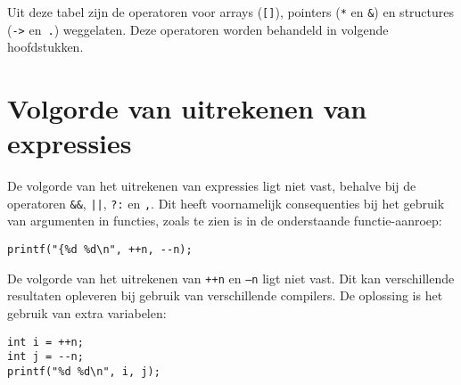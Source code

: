 Uit deze tabel zijn de operatoren voor arrays (\texttt{[]}), pointers (\texttt{*} en \texttt{\&}) en structures (\texttt{->} en~\texttt{.}) weggelaten. Deze operatoren worden behandeld in volgende hoofdstukken.


\section{Volgorde van uit\textsl{}rekenen van expressies}
De volgorde van het uitrekenen van expressies ligt niet vast, behalve bij de operatoren \texttt{\&\&}, \texttt{||}, \texttt{?:} en \texttt{,}. Dit heeft voornamelijk consequenties bij het gebruik van argumenten in functies, zoals te zien is in de onderstaande functie-aanroep:

\begin{lstlisting}[style=lstoneline]
printf("{%d %d\n", ++n, --n);
\end{lstlisting}

De volgorde van het uitrekenen van \texttt{++n} en \texttt{--n} ligt niet vast. Dit kan verschillende resultaten opleveren bij gebruik van verschillende compilers. De oplossing is het gebruik van extra variabelen:

\begin{lstlisting}[style=lstoneline]
int i = ++n;
int j = --n;
printf("%d %d\n", i, j);
\end{lstlisting}


